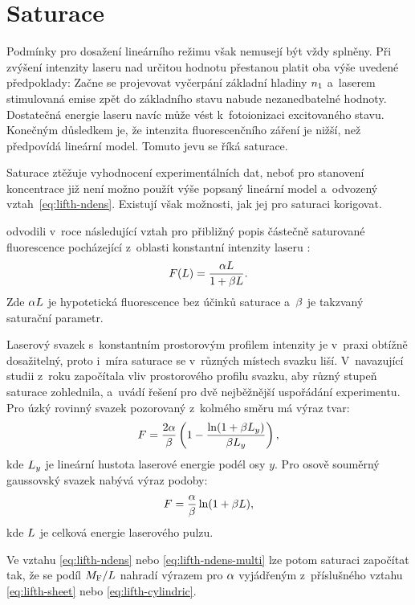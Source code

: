 \section{Saturace}
\label{sec:lifth-saturation}
Podmínky pro dosažení lineárního režimu však nemusejí být vždy splněny.
Při zvýšení intenzity laseru nad určitou hodnotu přestanou platit oba
výše uvedené předpoklady:
Začne se projevovat vyčerpání základní hladiny $n_1$
a~laserem stimulovaná emise zpět do základního stavu nabude nezanedbatelné
hodnoty.
Dostatečná energie laseru navíc může vést k~fotoionizaci excitovaného stavu.
Konečným důsledkem je, že intenzita fluorescenčního záření je nižší,
než předpovídá lineární model.
Tomuto jevu se říká saturace.

Saturace ztěžuje vyhodnocení experimentálních dat, neboť pro stanovení
koncentrace již není možno použít výše popsaný lineární model
a~odvozený vztah~\eqref{eq:lifth-ndens}.
Existují však možnosti, jak jej pro saturaci korigovat.

 odvodili v~roce \citeyear{lif-saturation}
následující vztah pro přibližný popis částečně saturované
fluorescence pocházející z~oblasti konstantní intenzity laseru
\autocite{lif-saturation}:
\begin{equation}
	F(L) = \frac{\alpha L}{1 + \beta L}.
\end{equation}
Zde $\alpha L$ je hypotetická fluorescence bez účinků saturace
a~$\beta$ je takzvaný saturační parametr.

Laserový svazek s~konstantním prostorovým profilem intenzity
je v~praxi obtížně dosažitelný,
proto i~míra saturace se v~různých místech svazku liší.
V~navazující studii z~roku \citeyear{lif-pb} započítala \citeauthor{lif-pb}
vliv prostorového profilu svazku, aby různý stupeň saturace zohlednila,
a~uvádí řešení pro dvě nejběžnější uspořádání experimentu.
Pro úzký rovinný svazek pozorovaný z~kolmého směru má výraz tvar:
\begin{equation}
	\label{eq:lifth-sheet}
	F = \frac{2\alpha}{\beta}
	\left( 1 - \frac{\ln(1 + \beta L_y)}{\beta L_y} \right),
\end{equation}
kde $L_y$ je lineární hustota laserové energie podél osy $y$.
Pro osově souměrný gaussovský svazek nabývá výraz podoby:
\begin{equation}
	\label{eq:lifth-cylindric}
	F = \frac{\alpha}{\beta}
	\ln(1 + \beta L),
\end{equation}
kde $L$ je celková energie laserového pulzu.
\autocite{lif-pb}

Ve vztahu \eqref{eq:lifth-ndens} nebo \eqref{eq:lifth-ndens-multi}
lze potom saturaci započítat tak,
že se podíl $M_\text{F}/L$ nahradí výrazem pro $\alpha$
vyjádřeným z~příslušného vztahu
\eqref{eq:lifth-sheet} nebo \eqref{eq:lifth-cylindric}.
